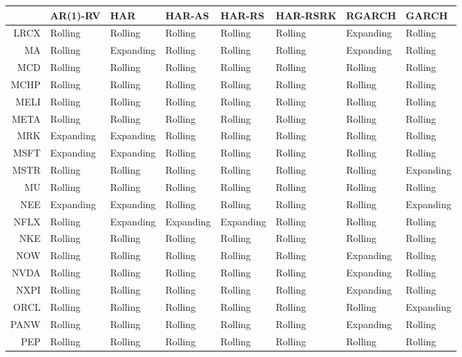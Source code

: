 \begin{table}[ht]
\centering
\begin{tabular}{rlllllll}
  \hline
 & AR(1)-RV & HAR & HAR-AS & HAR-RS & HAR-RSRK & RGARCH & GARCH \\ 
  \hline
LRCX & Rolling & Rolling & Rolling & Rolling & Rolling & Expanding & Rolling \\ 
  MA & Rolling & Expanding & Rolling & Rolling & Rolling & Expanding & Rolling \\ 
  MCD & Rolling & Rolling & Rolling & Rolling & Rolling & Rolling & Rolling \\ 
  MCHP & Rolling & Rolling & Rolling & Rolling & Rolling & Rolling & Rolling \\ 
  MELI & Rolling & Rolling & Rolling & Rolling & Rolling & Rolling & Rolling \\ 
  META & Rolling & Rolling & Rolling & Rolling & Rolling & Rolling & Rolling \\ 
  MRK & Expanding & Expanding & Rolling & Rolling & Rolling & Rolling & Rolling \\ 
  MSFT & Expanding & Expanding & Rolling & Rolling & Rolling & Rolling & Rolling \\ 
  MSTR & Rolling & Rolling & Rolling & Rolling & Rolling & Rolling & Expanding \\ 
  MU & Rolling & Rolling & Rolling & Rolling & Rolling & Rolling & Rolling \\ 
  NEE & Expanding & Expanding & Rolling & Rolling & Rolling & Rolling & Expanding \\ 
  NFLX & Rolling & Expanding & Expanding & Expanding & Rolling & Rolling & Rolling \\ 
  NKE & Rolling & Rolling & Rolling & Rolling & Rolling & Rolling & Rolling \\ 
  NOW & Rolling & Rolling & Rolling & Rolling & Rolling & Expanding & Rolling \\ 
  NVDA & Rolling & Rolling & Rolling & Rolling & Rolling & Expanding & Rolling \\ 
  NXPI & Rolling & Rolling & Rolling & Rolling & Rolling & Expanding & Rolling \\ 
  ORCL & Rolling & Rolling & Rolling & Rolling & Rolling & Rolling & Expanding \\ 
  PANW & Rolling & Rolling & Rolling & Rolling & Rolling & Expanding & Rolling \\ 
  PEP & Rolling & Rolling & Rolling & Rolling & Rolling & Rolling & Rolling \\ 

\end{tabular}
\end{table}
